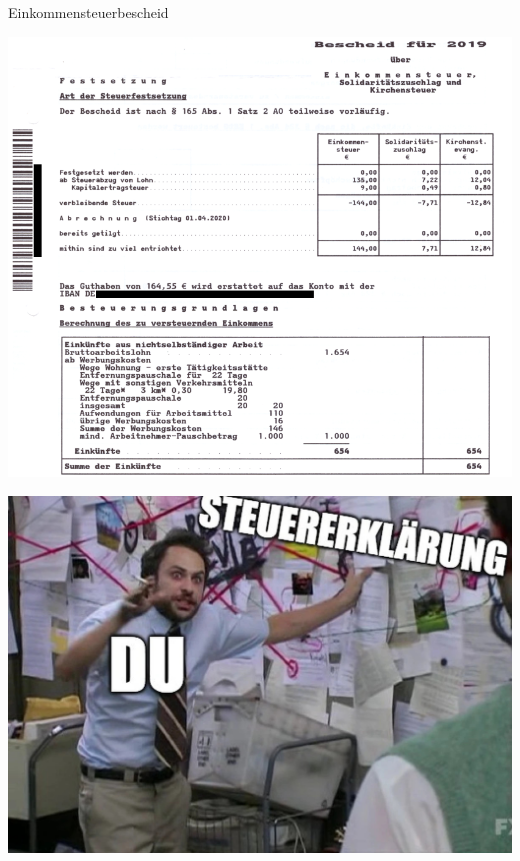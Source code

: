 \documentclass{beamer}
\begin{document}
			\begin{frame}{Einkommensteuerbescheid}
				\begin{center}
					\includegraphics[width=0.55\linewidth]{images/einkommensteuerbescheid_2019}
				\end{center}
			\end{frame}
			
			\begin{frame}
				\begin{center}
					\includegraphics[height=0.9\textheight]{images/meme-tax-insane.jpg}
				\end{center}
			\end{frame}
		
\end{document}

